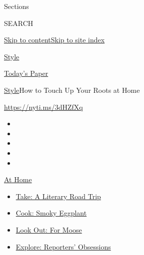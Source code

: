 Sections

SEARCH

\protect\hyperlink{site-content}{Skip to
content}\protect\hyperlink{site-index}{Skip to site index}

\href{https://www.nytimes3xbfgragh.onion/section/style}{Style}

\href{https://myaccount.nytimes3xbfgragh.onion/auth/login?response_type=cookie\&client_id=vi}{}

\href{https://www.nytimes3xbfgragh.onion/section/todayspaper}{Today's
Paper}

\href{/section/style}{Style}\textbar{}How to Touch Up Your Roots at Home

\url{https://nyti.ms/3dHZfXq}

\begin{itemize}
\item
\item
\item
\item
\item
\end{itemize}

\href{https://www.nytimes3xbfgragh.onion/spotlight/at-home?action=click\&pgtype=Article\&state=default\&region=TOP_BANNER\&context=at_home_menu}{At
Home}

\begin{itemize}
\tightlist
\item
  \href{https://www.nytimes3xbfgragh.onion/2020/07/28/books/time-for-a-literary-road-trip.html?action=click\&pgtype=Article\&state=default\&region=TOP_BANNER\&context=at_home_menu}{Take:
  A Literary Road Trip}
\item
  \href{https://www.nytimes3xbfgragh.onion/2020/07/29/magazine/bored-with-your-home-cooking-some-smoky-eggplant-will-fix-that.html?action=click\&pgtype=Article\&state=default\&region=TOP_BANNER\&context=at_home_menu}{Cook:
  Smoky Eggplant}
\item
  \href{https://www.nytimes3xbfgragh.onion/2020/07/27/travel/moose-michigan-isle-royale.html?action=click\&pgtype=Article\&state=default\&region=TOP_BANNER\&context=at_home_menu}{Look
  Out: For Moose}
\item
  \href{https://www.nytimes3xbfgragh.onion/interactive/2020/at-home/even-more-reporters-editors-diaries-lists-recommendations.html?action=click\&pgtype=Article\&state=default\&region=TOP_BANNER\&context=at_home_menu}{Explore:
  Reporters' Obsessions}
\end{itemize}

